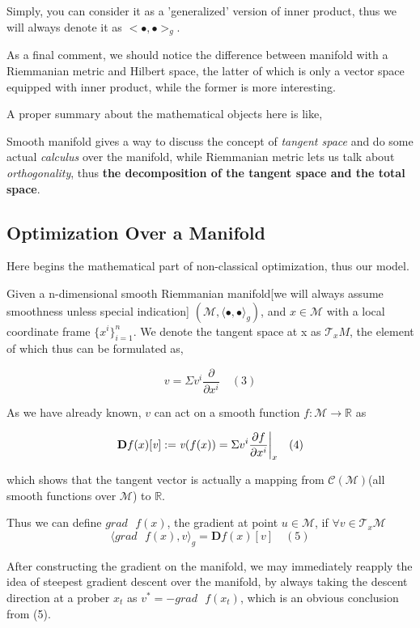 \documentclass[letterpaper]{article}
\begin{document}
Simply, you can consider it as a 'generalized' version of inner product, thus we will always denote it as $<\bullet,\bullet>_g$.

As a final comment, we should notice the difference between manifold with a Riemmanian metric and Hilbert space, the latter of which is only a vector space equipped with inner product, while the former is more interesting.

A proper summary about the mathematical objects here is like,

Smooth manifold gives a way to discuss the concept of \textit{tangent space} and do some actual \textit{calculus} over the manifold, while Riemmanian metric lets us
talk about \textit{orthogonality}, thus \textbf{the decomposition of the tangent space and the total space}.



\subsection{Optimization Over a Manifold}
Here begins the mathematical part of non-classical optimization, thus our model.

Given a n-dimensional smooth Riemmanian manifold[we will always assume smoothness unless special indication] $(\mathcal{M}, \langle\bullet,\bullet\rangle_g)$,
and $x\in\mathcal{M}$ with a local coordinate frame $\{x^i\}_{i=1}^n$. We denote the tangent space at x as $\mathcal{T}_x{M}$, the element of which
thus can be formulated as,

$$
  \mathit{v} = \Sigma\mathit{v}^i\frac{\partial}{\partial{x^i}} \quad (3)
$$

As we have already known, $\mathit{v}$ can act on a smooth function $f:\mathcal{M}\to\mathbb{R}$ as

$$
  \mathbf{D}f(x)[\mathit{v}]:=\mathit{v}(f(x))=\Sigma{v^i\frac{\partial{f}}{\partial{x^i}}\bigg{|}_x} \quad (4)
$$

which shows that the tangent vector is actually a mapping from $\mathcal{C}(\mathcal{M})$(all smooth functions over $\mathcal{M}$) to $\mathbb{R}$.

Thus we can define $grad \text{ } f(x)$, the gradient at point $u\in\mathcal{M}$,
if $\forall \mathit{v}\in\mathcal{T}_x\mathcal{M}$
$$
   \langle{}grad \text{ } f(x), \mathit{v}\rangle_g = \mathbf{D}f(x)[\mathit{v}] \quad (5)
$$

After constructing the gradient on the manifold, we may immediately reapply the idea of steepest gradient descent over the manifold,
by always taking the descent direction at a prober $x_t$ as $\mathit{v}^{*}=-grad\text{ }f(x_t)$, which is an obvious conclusion from (5).
\end{document}
